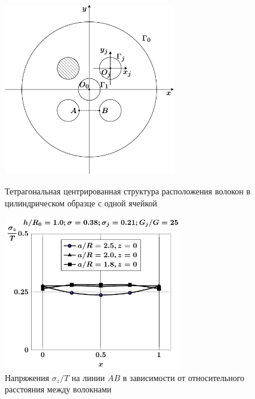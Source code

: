 \begin{russian}
\begin{figure}[h!]
\centering\footnotesize
\parbox[b]{7.5cm}{\centering\includegraphics[width=7.5cm]{inc-5.pdf}
\caption{Тетрагональная центрированная структура расположения волокон в цилиндрическом образце с одной ячейкой
\label{f:7:inc-5}}}\hfil\hfil
\parbox[b]{7.5cm}{\centering\includegraphics[width=7.8cm]{inc5-a-sig_z.pdf}
\caption{Напряжения $\sigma_z/T$ на линии $AB$ в зависимости от относительного расстояния между волокнами
\label{f:7:76}}}
\end{figure}


\end{russian}
